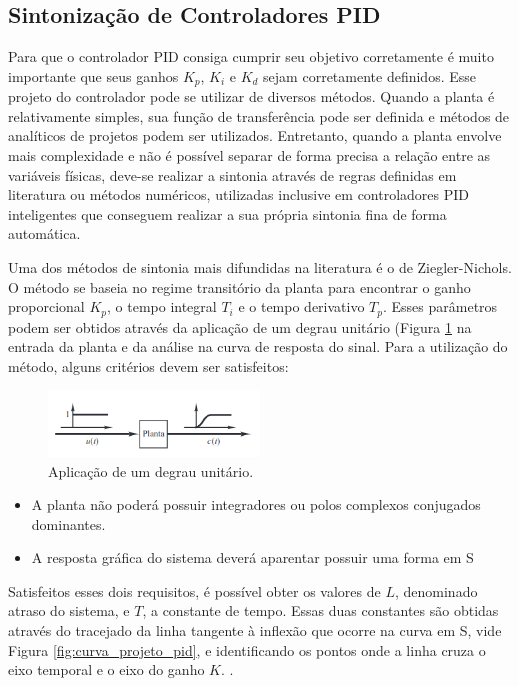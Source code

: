 \subsection{Sintonização de Controladores PID}
Para que o controlador PID consiga cumprir seu objetivo corretamente é muito importante que seus ganhos $K_{p}$, $K_{i}$ e $K_{d}$ sejam corretamente definidos. Esse projeto do controlador pode se utilizar de diversos métodos. Quando a planta é relativamente simples, sua função de transferência pode ser definida e métodos de analíticos de projetos podem ser utilizados. Entretanto, quando a planta envolve mais complexidade e não é possível separar de forma precisa a relação entre as variáveis físicas, deve-se realizar a sintonia através de regras definidas em literatura ou métodos numéricos, utilizadas inclusive em controladores PID inteligentes que conseguem realizar a sua própria sintonia fina de forma automática. \cite{ogata2011engenharia}
\par
Uma dos métodos de sintonia mais difundidas na literatura é o de  Ziegler-Nichols. O método se baseia no regime transitório da planta para encontrar o ganho proporcional $K_{p}$, o tempo integral $T_{i}$ e o tempo derivativo $T_{p}$. Esses parâmetros podem ser obtidos através da aplicação de um degrau unitário (Figura \ref{fig:resposta_degrau_unitario}  na entrada da planta e da análise na curva de resposta do sinal. Para a utilização do método, alguns critérios devem ser satisfeitos:
\begin{figure}[ht]
    \centering
    \includegraphics[width=0.5\textwidth]{capitulos/resposta_degrau_planta.png}
    \caption{Aplicação de um degrau unitário.\cite{ogata2011engenharia}}
    \label{fig:resposta_degrau_unitario}
\end{figure}
    \begin{itemize}
        \item A planta não poderá possuir integradores ou polos complexos conjugados dominantes.
        \item A resposta gráfica do sistema deverá aparentar possuir uma forma em S
    \end{itemize}
    Satisfeitos esses dois requisitos, é possível obter os valores de $L$, denominado atraso do sistema, e $T$, a constante de tempo. Essas duas constantes são obtidas através do tracejado da linha tangente à inflexão que ocorre na curva em S, vide Figura \ref{fig:curva_projeto_pid}, e identificando os pontos onde a linha cruza o eixo temporal e o eixo do ganho $K$. . 
